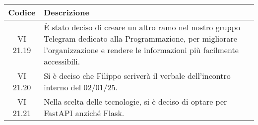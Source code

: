 \clearpage
\vspace*{-2cm} 
\begin{table}[t]
    \centering
    \begin{tabular}{|c|p{}|}
        \hline
        \rowcolor[gray]{0.75}
        \textbf{Codice} & \textbf{Descrizione}\\
        \hline    
        VI 21.19 & È stato deciso di creare un altro ramo nel nostro gruppo Telegram dedicato alla Programmazione, per migliorare l'organizzazione e rendere le informazioni più facilmente accessibili.\\
        \hline 
        VI 21.20 & Si è deciso che Filippo scriverà il verbale dell'incontro interno del 02/01/25. \\
        \hline
        VI 21.21 & Nella scelta delle tecnologie, si è deciso di optare per FastAPI anziché Flask. \\
        \hline
    \end{tabular}
\end{table}

\clearpage
